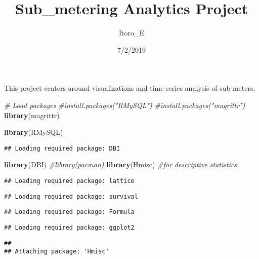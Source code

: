 \documentclass[]{article}
\title{Sub\_metering Analytics Project}
\author{Itoro\_E}
\date{7/2/2019}
\newenvironment{Shaded}{\begin{snugshade}}{\end{snugshade}}
\newcommand{\CommentTok}[1]{\textcolor[rgb]{0.56,0.35,0.01}{\textit{#1}}}
\newcommand{\KeywordTok}[1]{\textcolor[rgb]{0.13,0.29,0.53}{\textbf{#1}}}
\newcommand{\NormalTok}[1]{#1}
\begin{document}
\maketitle

This project centers around visualizations and time series analysis of
sub-meters.

\begin{Shaded}
\begin{Highlighting}[]
\CommentTok{# Load packages}
\CommentTok{#install.packages("RMySQL")}
\CommentTok{#install.packages("magrittr")}
\KeywordTok{library}\NormalTok{(magrittr)}
\end{Highlighting}
\end{Shaded}

\begin{Shaded}
\begin{Highlighting}[]
\KeywordTok{library}\NormalTok{(RMySQL)}
\end{Highlighting}
\end{Shaded}

\begin{verbatim}
## Loading required package: DBI
\end{verbatim}

\begin{Shaded}
\begin{Highlighting}[]
\KeywordTok{library}\NormalTok{(DBI)}
\CommentTok{#library(pacman)}
\KeywordTok{library}\NormalTok{(Hmisc)      }\CommentTok{#for descriptive statistics}
\end{Highlighting}
\end{Shaded}

\begin{verbatim}
## Loading required package: lattice
\end{verbatim}

\begin{verbatim}
## Loading required package: survival
\end{verbatim}

\begin{verbatim}
## Loading required package: Formula
\end{verbatim}

\begin{verbatim}
## Loading required package: ggplot2
\end{verbatim}

\begin{verbatim}
## 
## Attaching package: 'Hmisc'
\end{verbatim}
\end{document}
